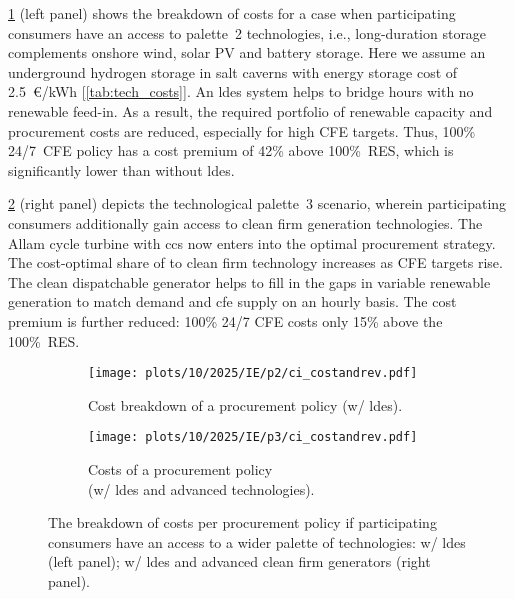 \cref{fig:10-2025-IE-p2-ci_costandrev} (left panel) shows the breakdown of costs for a case when participating consumers have an access to palette~2 technologies, i.e., long-duration storage complements onshore wind, solar PV and battery storage.
Here we assume an underground hydrogen storage in salt caverns with energy storage cost of 2.5~\euro/kWh [\cref{tab:tech_costs}].
An \gls{ldes} system helps to bridge hours with no renewable feed-in. 
As a result, the required portfolio of renewable capacity and procurement costs are reduced, especially for high CFE targets.
Thus, 100\% 24/7~CFE policy has a cost premium of 42\% above 100\%~RES, which is significantly lower than without \gls{ldes}.

\cref{fig:10-2025-IE-p3-ci_costandrev} (right panel) depicts the technological palette~3 scenario, wherein participating consumers additionally gain access to clean firm generation technologies.
The Allam cycle turbine with \gls{ccs} now enters into the optimal procurement strategy.
The cost-optimal share of to clean firm technology increases as CFE targets rise.
The clean dispatchable generator helps to fill in the gaps in variable renewable generation to match demand and \gls{cfe} supply on an hourly basis.
The cost premium is further reduced: 100\% 24/7 CFE costs only 15\% above the 100\%~RES.

\begin{figure*}
    \centering
    \begin{subfigure}{0.5\textwidth}
        \centering
        \caption{Cost breakdown of a procurement policy (w/ \gls{ldes}).}
        \texttt{[image: plots/10/2025/IE/p2/ci\_costandrev.pdf]}
        \label{fig:10-2025-IE-p2-ci_costandrev}
    \end{subfigure}%
    \begin{subfigure}{0.5\textwidth}
        \centering
        \caption{Costs of a procurement policy \\ 
        (w/ \gls{ldes} and advanced technologies).}
        \texttt{[image: plots/10/2025/IE/p3/ci\_costandrev.pdf]}
        \label{fig:10-2025-IE-p3-ci_costandrev}
    \end{subfigure}
    \caption{The breakdown of costs per procurement policy if participating consumers have an access to a wider palette of technologies: w/ \gls{ldes} (left panel); w/ \gls{ldes} and advanced clean firm generators (right panel).
    }
    \label{fig:10-2025-IE-p23-ci_procurement}
\end{figure*}


